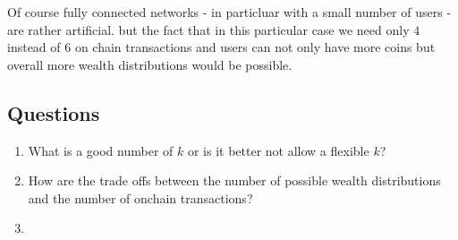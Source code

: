 \documentclass[10pt,twocolumn]{article}
\begin{document}
Of course fully connected networks - in particluar with a small number of users - are rather artificial. but the fact that in this particular case we need only $4$ instead of $6$ on chain transactions and users can not only have more coins but overall more wealth distributions would be possible.

\subsection{Questions}
\begin{enumerate}
\item What is a good number of $k$ or is it better not allow a flexible $k$?
\item How are the trade offs between the number of possible wealth distributions and the number of onchain transactions?
\item 
\end{enumerate}




\end{document}
